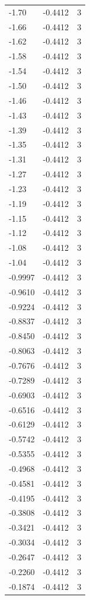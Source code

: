 \begin{longtable}{lrr}
  -1.70 & -0.4412 & 3 \\
  -1.66 & -0.4412 & 3 \\
  -1.62 & -0.4412 & 3 \\
  -1.58 & -0.4412 & 3 \\
  -1.54 & -0.4412 & 3 \\
  -1.50 & -0.4412 & 3 \\
  -1.46 & -0.4412 & 3 \\
  -1.43 & -0.4412 & 3 \\
  -1.39 & -0.4412 & 3 \\
  -1.35 & -0.4412 & 3 \\
  -1.31 & -0.4412 & 3 \\
  -1.27 & -0.4412 & 3 \\
  -1.23 & -0.4412 & 3 \\
  -1.19 & -0.4412 & 3 \\
  -1.15 & -0.4412 & 3 \\
  -1.12 & -0.4412 & 3 \\
  -1.08 & -0.4412 & 3 \\
  -1.04 & -0.4412 & 3 \\
  -0.9997 & -0.4412 & 3 \\
  -0.9610 & -0.4412 & 3 \\
  -0.9224 & -0.4412 & 3 \\
  -0.8837 & -0.4412 & 3 \\
  -0.8450 & -0.4412 & 3 \\
  -0.8063 & -0.4412 & 3 \\
  -0.7676 & -0.4412 & 3 \\
  -0.7289 & -0.4412 & 3 \\
  -0.6903 & -0.4412 & 3 \\
  -0.6516 & -0.4412 & 3 \\
  -0.6129 & -0.4412 & 3 \\
  -0.5742 & -0.4412 & 3 \\
  -0.5355 & -0.4412 & 3 \\
  -0.4968 & -0.4412 & 3 \\
  -0.4581 & -0.4412 & 3 \\
  -0.4195 & -0.4412 & 3 \\
  -0.3808 & -0.4412 & 3 \\
  -0.3421 & -0.4412 & 3 \\
  -0.3034 & -0.4412 & 3 \\
  -0.2647 & -0.4412 & 3 \\
  -0.2260 & -0.4412 & 3 \\
  -0.1874 & -0.4412 & 3 \\

\end{longtable}
